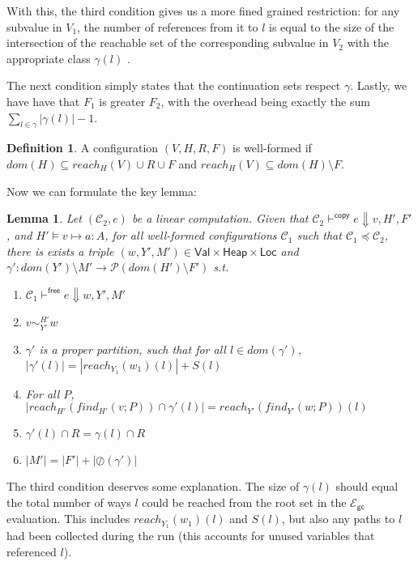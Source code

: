 \documentclass{easychair}
\newcommand{\ms}[1]{\ensuremath{\mathsf{#1}}}
\newcommand{\veq}[4]{#3 \sim^{#1}_{#2} #4}
\newcommand{\oh}[1]{\oslash(#1)}
\newcommand{\gcSem}{\ensuremath{\mathcal{E}_{\ms{gc}}}}
\newtheorem{lemma}[theorem]{Lemma}
\theoremstyle{definition}
\newtheorem{definition}{Definition}
\begin{document}
With this, the third condition gives us a more fined grained restriction: for any subvalue in $V_1$,
the number of references from it to $l$ is equal to the size of 
the intersection of the reachable set of the corresponding subvalue in $V_2$
with the appropriate class $\gamma(l)$ .

The next condition simply states that the continuation sets respect $\gamma$. Lastly, 
we have have that $F_1$ is greater $F_2$, with the overhead being exactly the sum 
$\sum_{l \in \gamma} |\gamma(l)| - 1$. 

\begin{definition} A configuration $(V,H,R,F)$ is well-formed if 
	$dom(H) \subseteq reach_H(V) \cup R \cup F$ and $reach_H(V) \subseteq dom(H)\setminus F$.
\end{definition}

Now we can formulate the key lemma:

\begin{lemma}
	Let $(\mathcal{C}_2,e)$ be a linear computation. Given that 
	$\mathcal{C}_2 \vdash^{\mathsf{copy}} e \Downarrow v,H',F'$, and $H' \vDash v \mapsto a : A$, 
	for all well-formed configurations $\mathcal{C}_1$ such that $\mathcal{C}_1 \preceq \mathcal{C}_2$,
there is exists a triple
$(w,Y',M') \in \ms{Val} \times \ms{Heap} \times \ms{Loc}$ and 
	$\gamma' : dom(Y') \setminus M' \to \mathcal{P}(dom(H') \setminus F')$ s.t.
	\begin{enumerate}
			\item $\mathcal{C}_1 \vdash^{\mathsf{free}} e \Downarrow w,Y',M'$
			\item $\veq{H'}{Y'}{v}{w}$
			\item $\gamma'$ is a proper partition, such that for all $l \in dom(\gamma')$, 
				$|\gamma'(l)| = |reach_{Y_1}(w_1)(l)| + S(l)$
			\item For all $P$, $|reach_{H'}(find_{H'}(v;P)) \cap \gamma'(l)| = 
				reach_{Y'}(find_{Y'}(w;P))(l)$
			\item $\gamma'(l) \cap R = \gamma(l) \cap R$
			\item $|M'| = |F'| + |\oh{\gamma'}|$
	\end{enumerate}
\end{lemma}

The third condition deserves some explanation. The size of $\gamma(l)$ should equal the total number 
of ways $l$ could be reached from the root set in the \gcSem evaluation. This includes 
$reach_{Y_1}(w_1)(l)$ and $S(l)$, but also any paths to $l$ had been collected during the run 
(this accounts for unused variables that referenced $l$).
\end{document}
